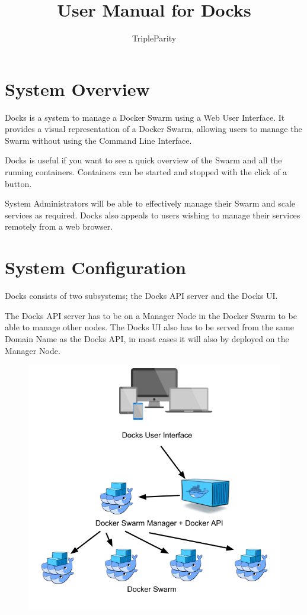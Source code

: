\documentclass[]{article}
\title{User Manual for Docks}
\author{TripleParity}
\date{}
\begin{document}
\maketitle

\tableofcontents

\section{System Overview}
Docks is a system to manage a Docker Swarm using a Web User Interface. It provides a visual representation of a Docker Swarm, allowing users to manage the Swarm without using the Command Line Interface.

Docks is useful if you want to see a quick overview of the Swarm and all the running containers. Containers can be started and stopped with the click of a button.

System Administrators will be able to effectively manage their Swarm and scale services as required. Docks also appeals to users wishing to manage their services remotely from a web browser.

\section{System Configuration}
Docks consists of two subsystems; the Docks API server and the Docks UI.

The Docks API server has to be on a Manager Node in the Docker Swarm to be able to manage other nodes. The Docks UI also has to be served from the same Domain Name as the Docks API, in most cases it will also by deployed on the Manager Node.

\begin{figure}[h!]
	\centering
	\includegraphics[scale=0.5]{pretty_docks.png}
\end{figure}
\end{document}
